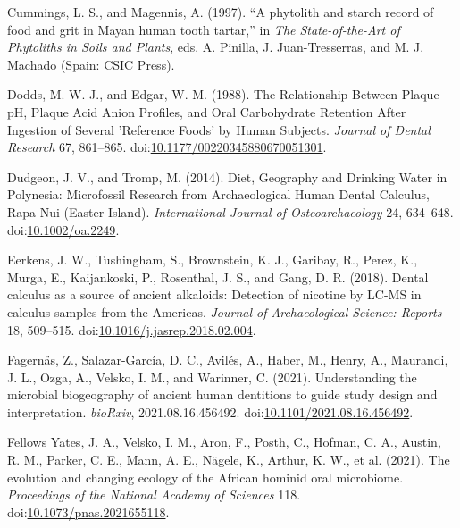 \documentclass[utf8]{frontiers/frontiersSCNS}
\newlength{\cslhangindent}
\newlength{\cslentryspacingunit} %
\newenvironment{CSLReferences}[2] %
 {%
  \setlength{\parindent}{0pt}
  \ifodd #1
  \let\oldpar\par
  \def\par{\hangindent=\cslhangindent\oldpar}
  \fi
  \setlength{\parskip}{#2\cslentryspacingunit}
 }%
 {}
\begin{document}
\begin{CSLReferences}{1}{0}
\leavevmode{}%
Cummings, L. S., and Magennis, A. (1997). {``A phytolith and starch record of food and grit in {Mayan} human tooth tartar,''} in \emph{The {State-of-the-Art} of {Phytoliths} in {Soils} and {Plants}}, eds. A. Pinilla, J. Juan-Tresserras, and M. J. Machado ({Spain}: {CSIC Press}).

\leavevmode{}%
Dodds, M. W. J., and Edgar, W. M. (1988). The {Relationship Between Plaque pH}, {Plaque Acid Anion Profiles}, and {Oral Carbohydrate Retention After Ingestion} of {Several} '{Reference Foods}' by {Human Subjects}. \emph{Journal of Dental Research} 67, 861--865. doi:\href{https://doi.org/10.1177/00220345880670051301}{10.1177/00220345880670051301}.

\leavevmode{}%
Dudgeon, J. V., and Tromp, M. (2014). Diet, {Geography} and {Drinking Water} in {Polynesia}: {Microfossil Research} from {Archaeological Human Dental Calculus}, {Rapa Nui} ({Easter Island}). \emph{International Journal of Osteoarchaeology} 24, 634--648. doi:\href{https://doi.org/10.1002/oa.2249}{10.1002/oa.2249}.

\leavevmode{}%
Eerkens, J. W., Tushingham, S., Brownstein, K. J., Garibay, R., Perez, K., Murga, E., Kaijankoski, P., Rosenthal, J. S., and Gang, D. R. (2018). Dental calculus as a source of ancient alkaloids: {Detection} of nicotine by {LC-MS} in calculus samples from the {Americas}. \emph{Journal of Archaeological Science: Reports} 18, 509--515. doi:\href{https://doi.org/10.1016/j.jasrep.2018.02.004}{10.1016/j.jasrep.2018.02.004}.

\leavevmode{}%
Fagernäs, Z., Salazar-García, D. C., Avilés, A., Haber, M., Henry, A., Maurandi, J. L., Ozga, A., Velsko, I. M., and Warinner, C. (2021). Understanding the microbial biogeography of ancient human dentitions to guide study design and interpretation. \emph{bioRxiv}, 2021.08.16.456492. doi:\href{https://doi.org/10.1101/2021.08.16.456492}{10.1101/2021.08.16.456492}.

\leavevmode{}%
Fellows Yates, J. A., Velsko, I. M., Aron, F., Posth, C., Hofman, C. A., Austin, R. M., Parker, C. E., Mann, A. E., Nägele, K., Arthur, K. W., et al. (2021). The evolution and changing ecology of the {African} hominid oral microbiome. \emph{Proceedings of the National Academy of Sciences} 118. doi:\href{https://doi.org/10.1073/pnas.2021655118}{10.1073/pnas.2021655118}.


\end{CSLReferences}
\end{document}
